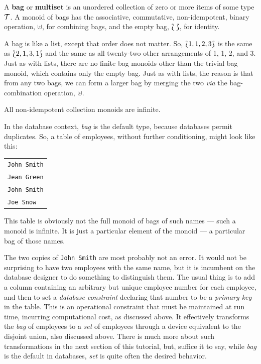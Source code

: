 \begin{definition}
  A \textbf{bag} or \textbf{multiset} is an unordered collection of zero or more items of some type $\mathcal{T}$. A monoid of bags has the associative, commutative, non-idempotent, binary operation, $\uplus$, for combining bags, and the empty bag, $\Lbag\,\Rbag$, for identity.
\end{definition}


A bag is like a list, except that order does not matter. So, $\Lbag 1, 1, 2, 3 \Rbag$ is the same as $\Lbag 2, 1, 3, 1\Rbag$ and the same as all twenty-two other arrangements of 1, 1, 2, and 3. Just as with lists, there are no finite bag monoids other than the trivial bag monoid, which contains only the empty bag. Just as with lists, the reason is that from any two bags, we can form a larger bag by merging the two \emph{via} the bag-combination operation, $\uplus$.


\begin{observation}
All non-idempotent collection monoids are infinite.
\end{observation}


In the database context, \emph{bag} is the default type, because databases permit duplicates. So, a table of employees, without further conditioning, might look like this:
\begin{center}
\begin{tabular}{l}
  \verb"John Smith"\\
  \verb"Jean Green"\\
  \verb"John Smith"\\
  \verb"Joe Snow"
\end{tabular}
\end{center}
This table is obviously not the full monoid of bags of such names --- such a monoid is infinite. It is just a particular element of the monoid --- a particular bag of those names.


The two copies of \verb"John Smith" are most probably not an error. It would not be surprising to have two employees with the same name, but it is incumbent on the database designer to do something to distinguish them. The usual thing is to add a column containing an arbitrary but unique employee number for each employee, and then to set a \emph{database constraint} declaring that number to be a \emph{primary key} in the table. This is an operational constraint that must be maintained at run time, incurring computational cost, as discussed above. It effectively transforms the \emph{bag} of employees to a \emph{set} of employees through a device equivalent to the disjoint union, also discussed above. There is much more about such transformations in the next section of this tutorial, but, suffice it to say, while \emph{bag} is the default in databases, \emph{set} is quite often the desired behavior.


